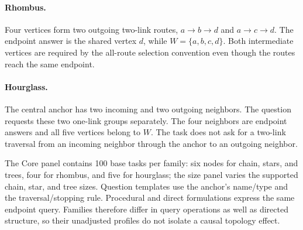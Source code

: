 \paragraph{Rhombus.}
Four vertices form two outgoing two-link routes, $a\to b\to d$ and $a\to c\to d$. The endpoint answer is the shared vertex $d$, while $W=\{a,b,c,d\}$. Both intermediate vertices are required by the all-route selection convention even though the routes reach the same endpoint.

\paragraph{Hourglass.}
The central anchor has two incoming and two outgoing neighbors. The question requests these two one-link groups separately. The four neighbors are endpoint answers and all five vertices belong to $W$. The task does not ask for a two-link traversal from an incoming neighbor through the anchor to an outgoing neighbor.

The Core panel contains 100 base tasks per family: six nodes for chain, stars, and trees, four for rhombus, and five for hourglass; the size panel varies the supported chain, star, and tree sizes. Question templates use the anchor's name/type and the traversal/stopping rule. Procedural and direct formulations express the same endpoint query. Families therefore differ in query operations as well as directed structure, so their unadjusted profiles do not isolate a causal topology effect.
